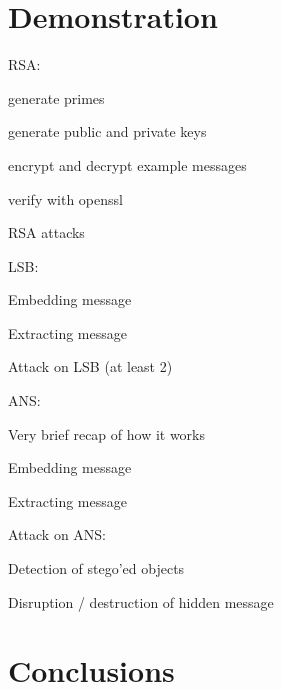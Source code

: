 \documentclass[presentation]{beamer}
\begin{document}
\section{Demonstration}
\label{sec-3}
\begin{frame}[label=sec-3-1]{RSA:}
\begin{block}{generate primes}
\end{block}
\begin{block}{generate public and private keys}
\end{block}
\begin{block}{encrypt and decrypt example messages}
\end{block}
\begin{block}{verify with openssl}
\end{block}
\end{frame}
\begin{frame}[label=sec-3-2]{RSA attacks}
\end{frame}
\begin{frame}[label=sec-3-3]{LSB:}
\begin{block}{Embedding message}
\end{block}
\begin{block}{Extracting message}
\end{block}
\end{frame}
\begin{frame}[label=sec-3-4]{Attack on LSB (at least 2)}
\end{frame}
\begin{frame}[label=sec-3-5]{ANS:}
\begin{block}{Very brief recap of how it works}
\end{block}
\begin{block}{Embedding message}
\end{block}
\begin{block}{Extracting message}
\end{block}
\end{frame}
\begin{frame}[label=sec-3-6]{Attack on ANS:}
\begin{block}{Detection of stego'ed objects}
\end{block}
\begin{block}{Disruption / destruction of hidden message}
\end{block}
\end{frame}
\section{Conclusions}
\label{sec-4}
\end{document}

